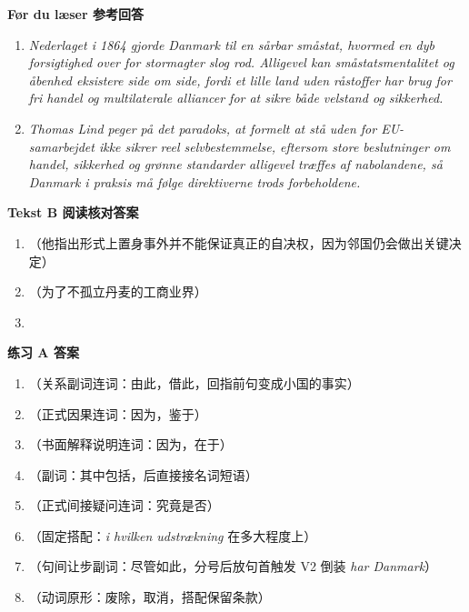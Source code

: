 \begin{answerbox}
\textbf{Før du læser 参考回答}
\begin{enumerate}
  \item \textit{Nederlaget i 1864 gjorde Danmark til en sårbar småstat, hvormed en dyb forsigtighed over for stormagter slog rod. Alligevel kan småstatsmentalitet og åbenhed eksistere side om side, fordi et lille land uden råstoffer har brug for fri handel og multilaterale alliancer for at sikre både velstand og sikkerhed.}
  \item \textit{Thomas Lind peger på det paradoks, at formelt at stå uden for EU-samarbejdet ikke sikrer reel selvbestemmelse, eftersom store beslutninger om handel, sikkerhed og grønne standarder alligevel træffes af nabolandene, så Danmark i praksis må følge direktiverne trods forbeholdene.}
\end{enumerate}

\textbf{Tekst B 阅读核对答案}
\begin{enumerate}
  \item {}（他指出形式上置身事外并不能保证真正的自决权，因为邻国仍会做出关键决定）
  \item {}（为了不孤立丹麦的工商业界）
  \item {}
\end{enumerate}

\textbf{练习 A 答案}
\begin{enumerate}
  \item {}（关系副词连词：由此，借此，回指前句变成小国的事实）
  \item {}（正式因果连词：因为，鉴于）
  \item {}（书面解释说明连词：因为，在于）
  \item {}（副词：其中包括，后直接接名词短语）
  \item {}（正式间接疑问连词：究竟是否）
  \item {}（固定搭配：\textit{i hvilken udstrækning} 在多大程度上）
  \item {}（句间让步副词：尽管如此，分号后放句首触发 V2 倒装 \textit{har Danmark}）
  \item {}（动词原形：废除，取消，搭配保留条款）
\end{enumerate}


\end{answerbox}
